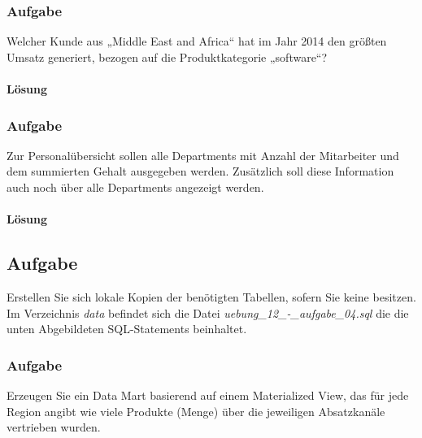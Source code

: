 \subsubsection{Aufgabe}
\label{subsec:uebung_12.aufgabe_03c}
Welcher Kunde aus „Middle East and Africa“ hat im Jahr 2014 den größten Umsatz generiert, bezogen auf die Produktkategorie „software“?

\paragraph*{Lösung}
\label{subsubsec:uebung_12.aufgabe_03c.loesung}

\subsubsection{Aufgabe}
\label{subsec:uebung_12.aufgabe_03d}
Zur Personalübersicht sollen alle Departments mit Anzahl der Mitarbeiter und dem summierten Gehalt ausgegeben werden. Zusätzlich soll diese Information auch noch über alle Departments angezeigt werden.

\paragraph*{Lösung}
\label{subsubsec:uebung_12.aufgabe_03d.loesung}


\subsection{Aufgabe}
\label{subsec:uebung_12.aufgabe_04}
Erstellen Sie sich lokale Kopien der benötigten Tabellen, sofern Sie keine besitzen. Im Verzeichnis \textit{data} befindet sich die Datei \textit{uebung\_12\_-\_aufgabe\_04.sql} die die unten Abgebildeten SQL-Statements beinhaltet.


\subsubsection{Aufgabe}
\label{subsec:uebung_12.aufgabe_04a}
Erzeugen Sie ein Data Mart basierend auf einem Materialized View, das für jede Region angibt
wie viele Produkte (Menge) über die jeweiligen Absatzkanäle vertrieben wurden.

